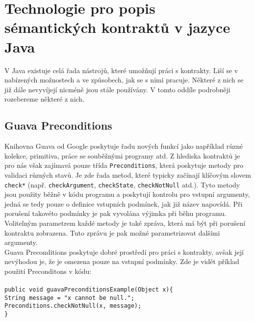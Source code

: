 	\section{Technologie pro popis sémantických kontraktů v jazyce Java}
		V Java existuje celá řada nástrojů, které umožňují práci s kontrakty. Liší se v nabízených možnostech a ve způsobech, jak se s nimi pracuje. Některé z nich se již dále nevyvíjejí nicméně jsou stále používány. V tomto oddíle podrobněji rozebereme některé z nich.		
	
		\subsection{Guava Preconditions}
			Knihovna Guava \cite{guava} od Google poskytuje řadu nových funkcí jako například různé kolekce, primitiva, práce se souběžnými programy atd. Z hlediska kontraktů je pro nás však zajímavá pouze třída \texttt{Preconditions}, která poskytuje metody pro validaci různých stavů. Je zde řada metod, které typicky začínají klíčovým slovem \texttt{check*} (např. \texttt{checkArgument}, \texttt{checkState}, \texttt{checkNotNull} atd.). Tyto metody jsou použity běžně v kódu programu a poskytují kontrolu pro vstupní argumenty, jedná se tedy pouze o definice vstupních podmínek, jak již název napovídá. Při porušení takovéto podmínky je pak vyvolána výjimka při běhu programu. Volitelným parametrem každé metody je také zpráva, která má být při porušení kontraktu zobrazena. Tuto zprávu je pak možné parametrizovat dalšími argumenty.\\
			
			Guava Preconditions poskytuje dobré prostředí pro práci s kontrakty, avšak její nevýhodou je, že je omezena pouze na vstupní podmínky. Zde je vidět příklad použití Preconditons v kódu:\\\\
			\- \- \- \- \- \texttt{public void guavaPreconditionsExample(Object x)\{}\\
			\- \- \- \- \- \- \- \- \- \- \texttt{String message = "x cannot be null.";}\\ 
        	\- \- \- \- \- \- \- \- \- \- \texttt{Preconditions.checkNotNull(x, message);}\\
    		\- \- \- \- \- \texttt{\}}\\
    		
